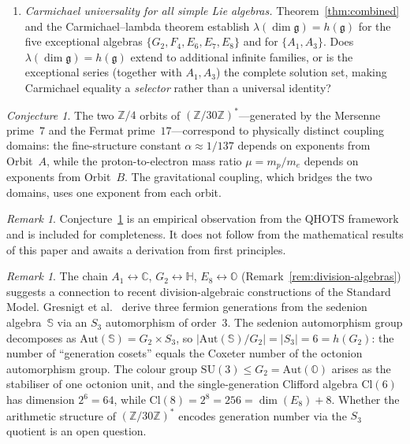 \documentclass[11pt]{amsart}
\theoremstyle{plain}
\theoremstyle{definition}
\theoremstyle{remark}
\newtheorem{remark}[theorem]{Remark}
\newtheorem{conjecture}[theorem]{Conjecture}
\newcommand{\fg}{\mathfrak{g}}
\begin{document}
\begin{enumerate}
  \item \emph{Carmichael universality for all simple Lie algebras.}
    Theorem~\ref{thm:combined} and the Carmichael--lambda theorem establish
    $\lambda(\dim\fg) = h(\fg)$ for the five exceptional algebras
    $\{G_2, F_4, E_6, E_7, E_8\}$ and for $\{A_1, A_3\}$.
    Does $\lambda(\dim\fg) = h(\fg)$ extend to additional infinite families,
    or is the exceptional series (together with $A_1, A_3$) the complete
    solution set, making Carmichael equality a \emph{selector} rather than
    a universal identity?
\end{enumerate}

\begin{conjecture}\label{conj:physics}
The two $\mathbb{Z}/4$ orbits of $(\mathbb{Z}/30\mathbb{Z})^*$---generated
by the Mersenne prime~$7$ and the Fermat prime~$17$---correspond to
physically distinct coupling domains: the fine-structure constant
$\alpha \approx 1/137$ depends on exponents from Orbit~$A$, while the
proton-to-electron mass ratio $\mu = m_p/m_e$ depends on exponents from
Orbit~$B$.  The gravitational coupling, which bridges the two domains,
uses one exponent from each orbit.
\end{conjecture}

\begin{remark}\label{rem:physics-caveat}
Conjecture~\ref{conj:physics} is an empirical observation from the QHOTS
framework and is included for completeness.  It does not follow from the
mathematical results of this paper and awaits a derivation from first
principles.
\end{remark}

\begin{remark}\label{rem:sedenions}
The chain $A_1 \leftrightarrow \mathbb{C}$,
$G_2 \leftrightarrow \mathbb{H}$,
$E_8 \leftrightarrow \mathbb{O}$
(Remark~\ref{rem:division-algebras}) suggests a connection to recent
division-algebraic constructions of the Standard Model.
Gresnigt et al.~\cite{Gresnigt2023} derive three fermion generations
from the sedenion algebra~$\mathbb{S}$ via an $S_3$ automorphism of
order~$3$.  The sedenion automorphism group decomposes as
$\mathrm{Aut}(\mathbb{S}) = G_2 \times S_3$, so
$|\mathrm{Aut}(\mathbb{S})/G_2| = |S_3| = 6 = h(G_2)$: the number of
``generation cosets'' equals the Coxeter number of the octonion
automorphism group.  The colour group
$\mathrm{SU}(3) \le G_2 = \mathrm{Aut}(\mathbb{O})$ arises as the
stabiliser of one octonion unit, and the single-generation
Clifford algebra $\mathrm{Cl}(6)$ has dimension $2^6 = 64$, while
$\mathrm{Cl}(8) = 2^8 = 256 = \dim(E_8) + 8$.  Whether the
arithmetic structure of $(\mathbb{Z}/30\mathbb{Z})^*$ encodes
generation number via the $S_3$ quotient is an open question.
\end{remark}
\end{document}
